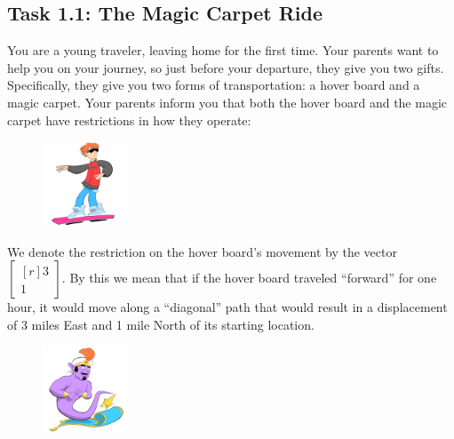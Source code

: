 \documentclass{problemset}
\newcommand{\mat}[1]{\begin{bmatrix*}[r]#1\end{bmatrix*}}
\begin{document}
\begin{iola}
\section*{Task 1.1: The Magic Carpet Ride}

You are a young traveler, leaving home for the first time. Your parents
want to help you on your journey, so just before your departure, they give you two
gifts. Specifically, they give you two forms of transportation: a hover board and
a magic carpet. Your parents inform you that both the hover board and the magic carpet
have restrictions in how they operate: 

\begin{minipage}{\textwidth}
	\vspace{.5cm}
	\begin{figure}
	\vspace{-.8cm}
	\includegraphics[width=1in]{images/HoverBoard-small.png}
	\end{figure}

	We denote the restriction on the hover board's movement by the vector
	$\mat{3 \\1}$. By this we mean that if
	the hover board traveled ``forward'' for one hour, it would move along a
	``diagonal'' path that would result in a displacement of 3 miles East and
	1 mile North of its starting location.
\end{minipage}

\begin{minipage}{\textwidth}
	\vspace{.5cm}
	\begin{figure}
	\vspace{-.8cm}
	\includegraphics[width=1in]{images/MagicCarpet-small.png}
	\end{figure}


\end{minipage}
\end{iola}
\end{document}
